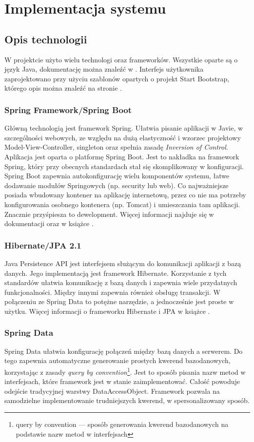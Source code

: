 \chapter{Implementacja systemu}
\thispagestyle{chapterBeginStyle}

\section{Opis technologii}
W projektcie użyto wielu technologi oraz frameworków. Wszystkie oparte są o język Java, dokumentację można znaleźć w \cite{Java-doc}. Interfejs użytkownika zaprojektowano przy użyciu szablonów opartych o projekt Start Bootstrap, którego opis można znaleźć na stronie \cite{sb}. 

\subsection{Spring Framework/Spring Boot}
Główną technologią jest framework Spring. Ułatwia pisanie aplikacji w Javie, w szczególności webowych, ze względu na dużą elastyczność i wzorzec projektowy Model-View-Controller, singleton oraz spełnia zasadę \textit{Inversion of Control}. Aplikacja jest oparta o platformę Spring Boot. Jest to nakładka na framework Spring, który przy obecnych standardach stał się skomplikowany w konfiguracji. Spring Boot zapewnia autokonfigurację wielu komponentów systemu, łatwe dodawanie modułów Springowych (np. security lub web). Co najważniejsze posiada wbudowany kontener na aplikację internetową, przez co nie ma potrzeby konfigurowania osobnego kontenera (np. Tomcat) i umieszczania tam aplikacji. Znacznie przyśpiesza to dewelopment. Więcej informacji najduje się w dokumentacji \cite{springb-docs} oraz w książce \cite{springbook}.

\subsection{Hibernate/JPA 2.1} 
Java Persistence API jest interfejsem służącym do komunikacji aplikacji z bazą danych. Jego implementacją jest framework Hibernate. Korzystanie z tych standardów ułatwia komunikację z bazą danych i zapewnia wiele przydatnych funkcjonalności. Między innymi zapewnia również obsługę transakcji. W połączeniu ze Spring Data to potężne narzędzie, a jednocześnie jest proste w użytku. Więcej informacji o frameworku Hibernate i JPA w książce \cite{JPA-hib}. 
\subsection{Spring Data}
Spring Data ułatwia konfigurację połączeń między bazą danych a serwerem. Do tego zapewnia automatyczne generowanie prostych kwerend bazodanowych, korzystając z zasady \textit{query by convention}\footnote{query by convention — sposób generowania kwerend bazodanowych na podstawie nazw metod w interfejsach}. Jest to sposób pisania nazw metod w interfejsach, które framework jest w stanie zaimplementować. Całość powoduje odejście tradycyjnej warstwy DataAccessObject. Framework pozwala na samodzielne implementowanie trudniejszych kwerend, w spersonalizowany sposób. 


